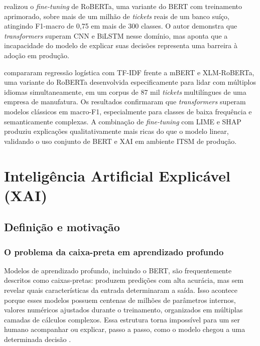 \documentclass[
    12pt,                %
    openright,           %
    oneside,             %
    a4paper,             %
    english,             %
    brazil               %
]{abntex2}
\begin{document}
 realizou o \textit{fine-tuning} de RoBERTa, 
uma variante do BERT com treinamento aprimorado, sobre mais de um 
milhão de \textit{tickets} reais de um banco suíço, atingindo 
F1-macro de 0,75 em mais de 300 classes. O autor demonstra que 
\textit{transformers} superam CNN e BiLSTM nesse domínio, mas aponta 
que a incapacidade do modelo de explicar suas decisões representa 
uma barreira à adoção em produção.

 compararam regressão logística com TF-IDF 
frente a mBERT e XLM-RoBERTa, uma variante do RoBERTa desenvolvida 
especificamente para lidar com múltiplos idiomas simultaneamente, 
em um corpus de 87 mil \textit{tickets} multilíngues de uma empresa 
de manufatura. Os resultados confirmaram que \textit{transformers} 
superam modelos clássicos em macro-F1, especialmente para classes 
de baixa frequência e semanticamente complexas. A combinação de 
\textit{fine-tuning} com LIME e SHAP produziu explicações 
qualitativamente mais ricas do que o modelo linear, validando o 
uso conjunto de BERT e XAI em ambiente ITSM de produção.

\section{Inteligência Artificial Explicável (XAI)}
\label{sec:xai}

\subsection{Definição e motivação}
\label{subsec:xai_definicao}

\subsubsection{O problema da caixa-preta em aprendizado profundo}
\label{subsubsec:xai_caixapreta}

Modelos de aprendizado profundo, incluindo o BERT, são frequentemente descritos como caixas-pretas: produzem predições com alta acurácia, mas sem revelar quais características da entrada determinaram a saída. Isso acontece porque esses modelos possuem centenas de milhões de 
parâmetros internos, valores numéricos ajustados durante o 
treinamento, organizados em múltiplas camadas de cálculos complexos. 
Essa estrutura torna impossível para um ser humano acompanhar ou 
explicar, passo a passo, como o modelo chegou a uma determinada 
decisão \cite{salih2023}.
\end{document}
